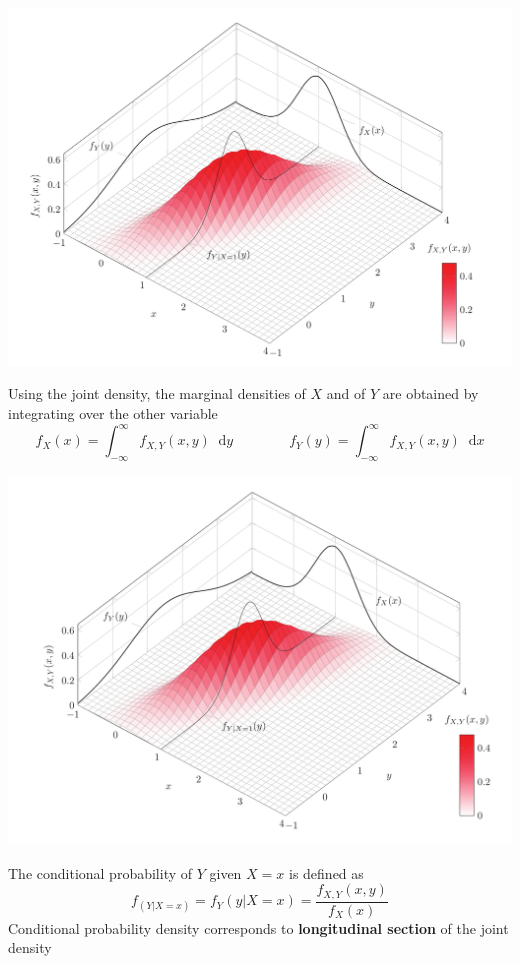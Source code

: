 \documentclass[11pt]{article}
\theoremstyle{definition}
\newcommand*\diff{\mathop{}\!\mathrm{d}}
\begin{document}
\begin{center}
	\includegraphics[width=0.8\linewidth]{img/marginal_density_xy}
\end{center}

Using the joint density, the marginal densities of $X$ and of $Y$ are obtained by integrating over the other variable
\begin{equation*}
	f_X(x) = \int_{-\infty}^{\infty}f_{X,Y}(x,y)\diff y \qquad\qquad f_Y(y) = \int_{-\infty}^{\infty}f_{X,Y}(x,y)\diff x
\end{equation*}

\begin{center}
	\includegraphics[width=0.8\linewidth]{img/conditional_probability_xy}
\end{center}

The conditional probability of $Y$ given $X = x$ is defined as
\begin{equation*}
	f_{(Y | X=x)} = f_Y (y | X=x) = \frac{f_{X,Y}(x,y)}{f_X(x)}
\end{equation*}
Conditional probability density corresponds to \textbf{longitudinal section} of the joint density
\end{document}
